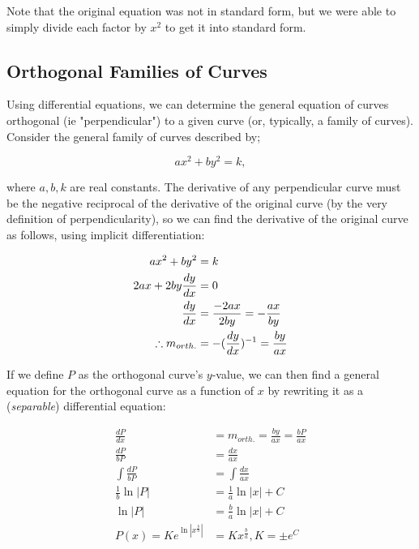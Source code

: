 \documentclass[12pt]{article}
\begin{document}
Note that the original equation was not in standard form, but we were able to simply divide each factor by $x^2$ to get it into standard form.

\subsection{Orthogonal Families of Curves}

Using differential equations, we can determine the general equation of curves orthogonal (ie "perpendicular") to a given curve (or, typically, a family of curves). Consider the general family of curves described by;

$$ax^2+by^2=k,$$

where $a,b,k$ are real constants. The derivative of any perpendicular curve must be the negative reciprocal of the derivative of the original curve (by the very definition of perpendicularity), so we can find the derivative of the original curve as follows, using implicit differentiation:

\begin{equation}
    \begin{split}
        ax^2+by^2 &= k\\
        2ax + 2by\frac{dy}{dx} &= 0\\
        \frac{dy}{dx} &= \frac{-2ax}{2by} = -\frac{ax}{by}\\
        \therefore m_{orth.} &= -(\frac{dy}{dx})^{-1} = \frac{by}{ax}\\
    \end{split}
\end{equation}

If we define $P$ as the orthogonal curve's $y$-value, we can then find a general equation for the orthogonal curve as a function of $x$ by rewriting it as a (\textit{separable}) differential equation:

\begin{equation}
    \begin{split}
        \frac{dP}{dx} &= m_{orth.} = \frac{by}{ax} = \frac{bP}{ax}\\
        \frac{dP}{bP} &= \frac{dx}{ax}\\
        \int \frac{dP}{bP} &= \int \frac{dx}{ax}\\
        \frac{1}{b}\ln |P| &= \frac{1}{a}\ln |x| + C\\
        \ln |P| &= \frac{b}{a}\ln|x|+C\\
        P(x) = Ke^{\ln |x^{\frac{b}{a}}|} &= Kx^{\frac{b}{a}}, K = \pm e^{C}\\
    \end{split}
\end{equation}
\end{document}
